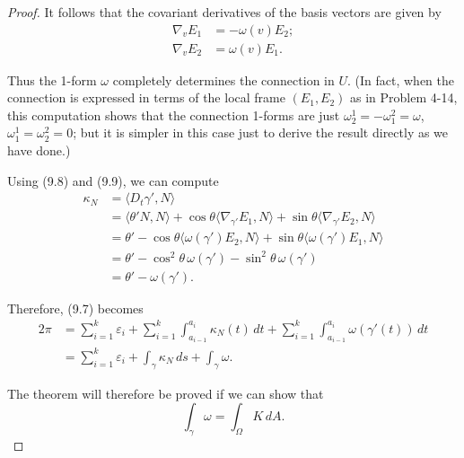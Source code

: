\begin{proof}
It follows that the covariant derivatives of the basis vectors are given by
\begin{align}
\nabla_v E_1 &= -\omega(v) E_2;\\
\nabla_v E_2 &= \omega(v) E_1.
\label{eq:covariant-frame-derivatives}
\tag{9.9}
\end{align}

Thus the 1-form $\omega$ completely determines the connection in $U$. (In fact, when the
connection is expressed in terms of the local frame $(E_1, E_2)$ as in Problem 4-14, this
computation shows that the connection 1-forms are just $\omega_2^1 = -\omega_1^2 = \omega$, $\omega_1^1 =
\omega_2^2 = 0$; but it is simpler in this case just to derive the result directly as we have
done.)

Using (9.8) and (9.9), we can compute
\begin{align*}
\kappa_N &= \langle D_t \gamma', N \rangle \\
&= \langle \theta' N, N \rangle + \cos \theta \langle \nabla_{\gamma'} E_1, N \rangle + \sin \theta \langle \nabla_{\gamma'} E_2, N \rangle \\
&= \theta' - \cos \theta \langle \omega(\gamma') E_2, N \rangle + \sin \theta \langle \omega(\gamma') E_1, N \rangle \\
&= \theta' - \cos^2 \theta\, \omega(\gamma') - \sin^2 \theta\, \omega(\gamma') \\
&= \theta' - \omega(\gamma').
\end{align*}

Therefore, (9.7) becomes
\begin{align*}
2\pi &= \sum_{i=1}^{k} \varepsilon_i + \sum_{i=1}^{k} \int_{a_{i-1}}^{a_i} \kappa_N(t)\, dt + \sum_{i=1}^{k} \int_{a_{i-1}}^{a_i} \omega(\gamma'(t))\, dt \\
&= \sum_{i=1}^{k} \varepsilon_i + \int_\gamma \kappa_N \, ds + \int_\gamma \omega.
\end{align*}

The theorem will therefore be proved if we can show that
\begin{equation}
\int_\gamma \omega = \int_\Omega K\, dA. \tag{9.10}
\end{equation}


\end{proof}
